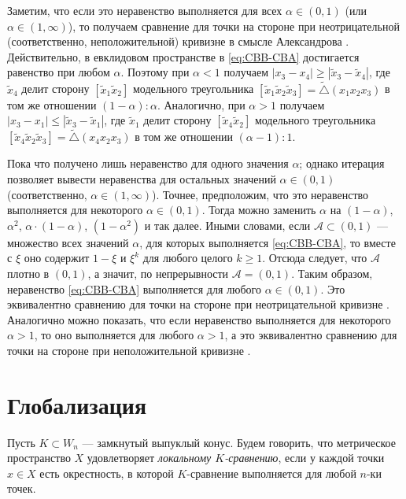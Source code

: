 Заметим, что если это неравенство выполняется для всех $\alpha\in (0,1)$ (или $\alpha\in (1,\infty)$), то получаем
сравнение для точки на стороне при неотрицательной (соответственно, неположительной) кривизне в смысле Александрова \cite[8.14, 9.14]{AKP-2024}.
Действительно, в евклидовом пространстве в \ref{eq:CBB-CBA} достигается равенство при любом $\alpha$.
Поэтому при $\alpha<1$ получаем $|x_3-x_4|\geqslant |\tilde x_3-\tilde x_4|$, где $\tilde x_4$ делит сторону $[\tilde x_1\tilde x_2]$ модельного треугольника $[\tilde x_1\tilde x_2\tilde x_3]=\tilde\triangle(x_1x_2x_3)$ в том же отношении $(1-\alpha):\alpha$.
Аналогично, при $\alpha>1$ получаем $|x_3-x_1|\leqslant |\tilde x_3-\tilde x_1|$, где $\tilde x_1$ делит сторону $[\tilde x_4\tilde x_2]$ модельного треугольника $[\tilde x_4\tilde x_2\tilde x_3]=\tilde\triangle(x_4x_2x_3)$ в том же отношении $(\alpha-1):1$.

Пока что получено лишь неравенство для одного значения $\alpha$;
однако итерация позволяет вывести неравенства для остальных значений $\alpha\in (0,1)$ (соответственно, $\alpha\in (1,\infty)$).
Точнее, предположим, что это неравенство выполняется для некоторого $\alpha\in (0,1)$.
Тогда можно заменить $\alpha$ на $(1-\alpha)$, $\alpha^2$,  $\alpha\cdot (1-\alpha)$, $(1-\alpha^2)$ и так далее.
Иными словами, если $\mathcal{A}\subset(0,1)$ --- множество всех значений $\alpha$, для которых выполняется \ref{eq:CBB-CBA}, то вместе с $\xi$ оно содержит $1-\xi$ и $\xi^k$ для любого целого $k\geqslant 1$.
Отсюда следует, что $\mathcal{A}$ плотно в $(0,1)$, а значит, по непрерывности $\mathcal{A}=(0,1)$.
Таким образом, неравенство \ref{eq:CBB-CBA} выполняется для любого $\alpha\in (0,1)$.
Это эквивалентно сравнению для точки на стороне при неотрицательной кривизне \cite[8.14]{AKP-2024}.
Аналогично можно показать, что если неравенство выполняется для некоторого $\alpha>1$, то оно выполняется для любого $\alpha>1$,
а это эквивалентно сравнению для точки на стороне при неположительной кривизне \cite[9.14]{AKP-2024}.
\qeds

\section{Глобализация}\label{par:globalization}

Пусть $K\subset W_n$ --- замкнутый выпуклый конус.
Будем говорить, что метрическое пространство $X$ удовлетворяет \emph{локальному $K$-сравнению}, если у каждой точки $x\in X$ есть окрестность, в которой $K$-сравнение выполняется для любой $n$-ки точек.

